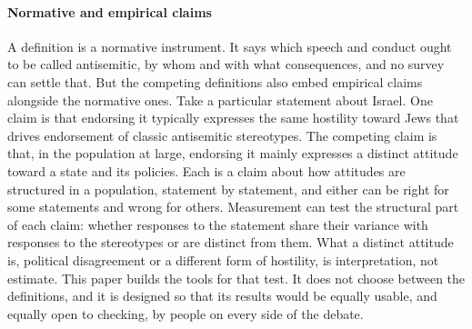 \paragraph{Normative and empirical claims}
A definition is a normative instrument. It says which speech and conduct
ought to be called antisemitic, by whom and with what consequences, and no
survey can settle that. But the competing definitions also embed empirical
claims alongside the normative ones. Take a particular statement about
Israel. One claim is that endorsing it typically expresses the same hostility
toward Jews that drives endorsement of classic antisemitic stereotypes. The
competing claim is that, in the population at large, endorsing it mainly
expresses a distinct attitude toward a state and its policies. Each is a
claim about how attitudes are structured in a population, statement by
statement, and either can be right for some statements and wrong for others.
Measurement can test the structural part of each claim: whether responses to
the statement share their variance with responses to the stereotypes or are
distinct from them. What a distinct attitude is, political disagreement or a
different form of hostility, is interpretation, not estimate. This paper
builds the tools for that test. It does not choose between the definitions,
and it is designed so that its results would be equally usable, and equally
open to checking, by people on every side of the debate.

%

